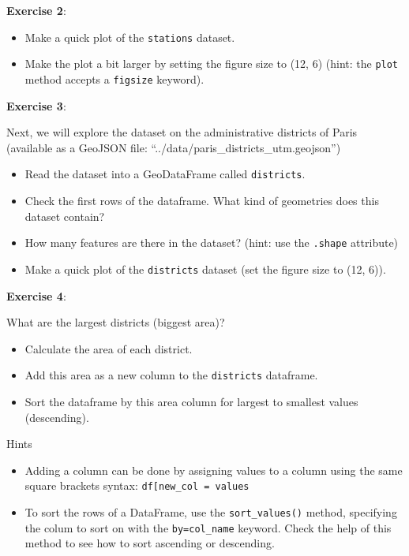 \documentclass[
  letterpaper,
  DIV=11,
  numbers=noendperiod]{scrreprt}
\providecommand{\tightlist}{%
  \setlength{\itemsep}{0pt}\setlength{\parskip}{0pt}}\usepackage{longtable,booktabs,array}
\begin{document}
\textbf{Exercise 2}:

\begin{itemize}
\tightlist
\item
  Make a quick plot of the \texttt{stations} dataset.
\item
  Make the plot a bit larger by setting the figure size to (12, 6)
  (hint: the \texttt{plot} method accepts a \texttt{figsize} keyword).
\end{itemize}

\textbf{Exercise 3}:

Next, we will explore the dataset on the administrative districts of
Paris (available as a GeoJSON file:
``../data/paris\_districts\_utm.geojson'')

\begin{itemize}
\tightlist
\item
  Read the dataset into a GeoDataFrame called \texttt{districts}.
\item
  Check the first rows of the dataframe. What kind of geometries does
  this dataset contain?
\item
  How many features are there in the dataset? (hint: use the
  \texttt{.shape} attribute)
\item
  Make a quick plot of the \texttt{districts} dataset (set the figure
  size to (12, 6)).
\end{itemize}

\textbf{Exercise 4}:

What are the largest districts (biggest area)?

\begin{itemize}
\tightlist
\item
  Calculate the area of each district.
\item
  Add this area as a new column to the \texttt{districts} dataframe.
\item
  Sort the dataframe by this area column for largest to smallest values
  (descending).
\end{itemize}

Hints

\begin{itemize}
\tightlist
\item
  Adding a column can be done by assigning values to a column using the
  same square brackets syntax:
  \texttt{df{[}\textquotesingle{}new\_col\textquotesingle{}{]}\ =\ values}
\item
  To sort the rows of a DataFrame, use the \texttt{sort\_values()}
  method, specifying the colum to sort on with the
  \texttt{by=\textquotesingle{}col\_name\textquotesingle{}} keyword.
  Check the help of this method to see how to sort ascending or
  descending.
\end{itemize}
\end{document}
